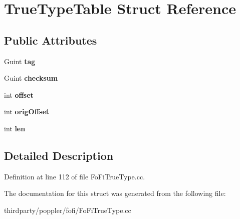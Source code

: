\hypertarget{struct_true_type_table}{}\section{True\+Type\+Table Struct Reference}
\label{struct_true_type_table}
\subsection*{Public Attributes}
\begin{DoxyCompactItemize}
\item 
\mbox{\label{struct_true_type_table_af7868b20c9df2d3adb590eb4f4120b5f}} 
Guint {\bfseries tag}
\item 
\mbox{\label{struct_true_type_table_a6ac33521d24c156e6676bb189985d6d7}} 
Guint {\bfseries checksum}
\item 
\mbox{\label{struct_true_type_table_a6b0e40495c5c64bb00df8673b8899461}} 
int {\bfseries offset}
\item 
\mbox{\label{struct_true_type_table_af1b6200ad9c18528bf7230eba53c66d7}} 
int {\bfseries orig\+Offset}
\item 
\mbox{\label{struct_true_type_table_ac0143e3af97f261a30b0a22eb7008d57}} 
int {\bfseries len}
\end{DoxyCompactItemize}


\subsection{Detailed Description}


Definition at line 112 of file Fo\+Fi\+True\+Type.\+cc.



The documentation for this struct was generated from the following file\+:\begin{DoxyCompactItemize}
\item 
thirdparty/poppler/fofi/Fo\+Fi\+True\+Type.\+cc\end{DoxyCompactItemize}
